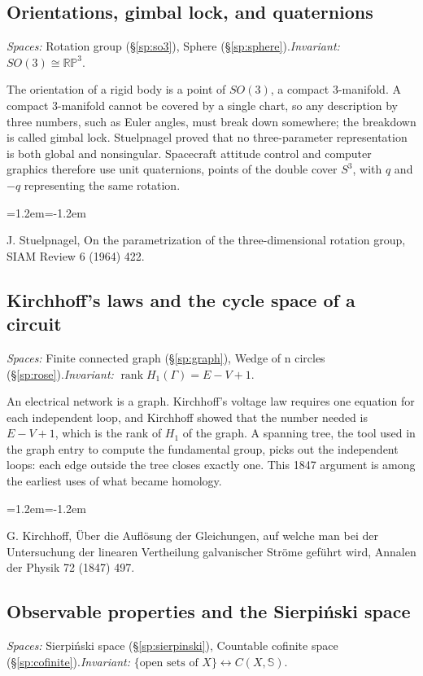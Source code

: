 \documentclass[11pt,twoside]{book}
\begin{document}
\subsection{Orientations, gimbal lock, and quaternions}\label{app:app-attitude}
\noindent\textit{Spaces:} Rotation group (\S\ref{sp:so3}), Sphere (\S\ref{sp:sphere}).\enspace\textit{Invariant:} $SO(3)\cong\mathbb{RP}^3$.

The orientation of a rigid body is a point of $SO(3)$, a compact 3-manifold. A compact 3-manifold cannot be covered by a single chart, so any description by three numbers, such as Euler angles, must break down somewhere; the breakdown is called gimbal lock. Stuelpnagel proved that no three-parameter representation is both global and nonsingular. Spacecraft attitude control and computer graphics therefore use unit quaternions, points of the double cover $S^3$, with $q$ and $-q$ representing the same rotation.
\begin{list}{}{\leftmargin=1.2em\itemindent=-1.2em\itemsep=0pt}\small \item J. Stuelpnagel, On the parametrization of the three-dimensional rotation group, SIAM Review 6 (1964) 422.\end{list}
\subsection{Kirchhoff's laws and the cycle space of a circuit}\label{app:app-kirchhoff}
\noindent\textit{Spaces:} Finite connected graph (\S\ref{sp:graph}), Wedge of n circles (\S\ref{sp:rose}).\enspace\textit{Invariant:} $\operatorname{rank}H_1(\Gamma)=E-V+1$.

An electrical network is a graph. Kirchhoff's voltage law requires one equation for each independent loop, and Kirchhoff showed that the number needed is $E-V+1$, which is the rank of $H_1$ of the graph. A spanning tree, the tool used in the graph entry to compute the fundamental group, picks out the independent loops: each edge outside the tree closes exactly one. This 1847 argument is among the earliest uses of what became homology.
\begin{list}{}{\leftmargin=1.2em\itemindent=-1.2em\itemsep=0pt}\small \item G. Kirchhoff, Über die Auflösung der Gleichungen, auf welche man bei der Untersuchung der linearen Vertheilung galvanischer Ströme geführt wird, Annalen der Physik 72 (1847) 497.\end{list}
\subsection{Observable properties and the Sierpiński space}\label{app:app-observable}
\noindent\textit{Spaces:} Sierpiński space (\S\ref{sp:sierpinski}), Countable cofinite space (\S\ref{sp:cofinite}).\enspace\textit{Invariant:} $\{\text{open sets of }X\}\leftrightarrow C(X,\mathbb{S})$.
\end{document}

